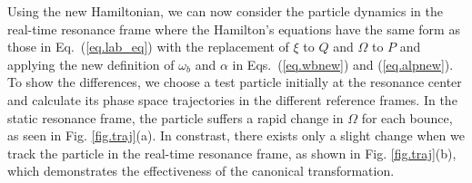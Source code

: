  Using the new Hamiltonian, we can now consider  the particle dynamics in the real-time resonance frame
 where the Hamilton's equations have the same form as those in Eq.~(\ref{eq.lab_eq}) with the replacement of $\xi$ to $Q$ and $\Omega$ to $P$ and applying the new definition of ${\omega_{b}}$ and $\alpha$  in Eqs.~(\ref{eq.wbnew}) and (\ref{eq.alpnew}).
To show the differences, we choose a test particle initially at the resonance center and calculate its phase space trajectories in the different reference frames. In the static resonance frame, the particle suffers a rapid change in $\Omega$  for each bounce, as seen   in Fig. \ref{fig.traj}(a). In constrast, there exists only a slight change when we track the particle in the real-time resonance frame, as shown in Fig. \ref{fig.traj}(b), which demonstrates the effectiveness of the canonical transformation.


